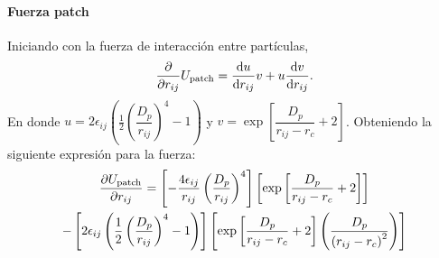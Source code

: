 \documentclass[../main.tex]{subfiles}
\begin{document}
\paragraph{Fuerza patch} Iniciando con la fuerza de interacción entre partículas,
\begin{gather*}
    \pdv{r_{ij}}U_{\mathrm{patch}} = \dv{u}{r_{ij}}v + u\dv{v}{r_{ij}}.
\end{gather*}
En donde \(u = 2\epsilon_{ij}\left( \frac{1}{2}\left(\dfrac{D_p}{r_{ij}}\right)^{4}-1\right)\) y \( v= \exp\left[\dfrac{D_{p}}{r_{ij}-r_{c}}+2\right]\).
Obteniendo la siguiente expresión para la fuerza:
\begin{multline*}
    \pdv{U_{\mathrm{patch}}}{r_{ij}} = 
    \left[-\frac{4\epsilon_{ij}}{r_{ij}}\left(\dfrac{D_p}{r_{ij}}\right)^{4}\right]
    \left[\exp\left[\dfrac{D_{p}}{r_{ij}-r_{c}}+2\right]\right]
    \\
    -
    \left[2\epsilon_{ij}\left( \frac{1}{2}\left(\dfrac{D_p}{r_{ij}}\right)^{4}-1\right)\right]
    \left[\exp\left[\dfrac{D_{p}}{r_{ij}-r_{c}}+2\right]\left(\dfrac{D_{p}}{\qty(r_{ij}-r_{c})^{2}}\right)\right]
\end{multline*}
\end{document}
